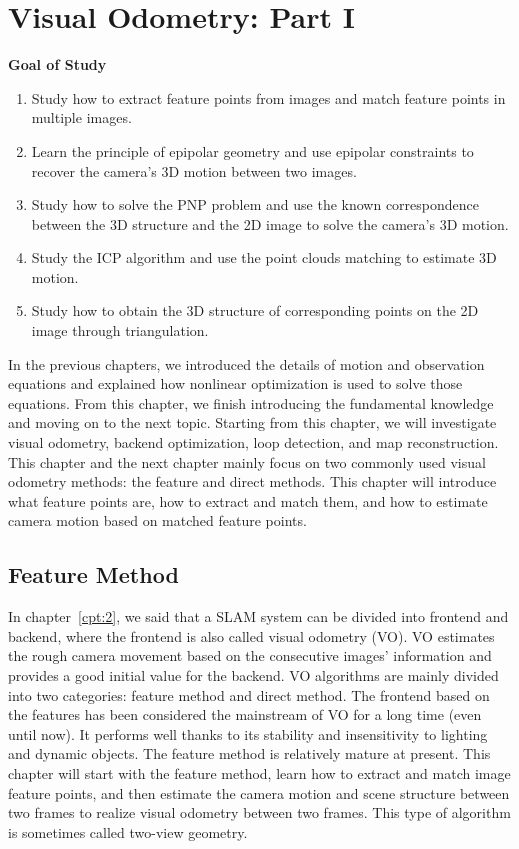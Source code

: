\chapter{Visual Odometry: Part I}
\label{cpt:7}
\thispagestyle{empty}

\begin{mdframed}  
	\textbf{Goal of Study}
	\begin{enumerate}[labelindent=0em,leftmargin=1.5em]
		\item Study how to extract feature points from images and match feature points in multiple images.
		\item Learn the principle of epipolar geometry and use epipolar constraints to recover the camera's 3D motion between two images.
		\item Study how to solve the PNP problem and use the known correspondence between the 3D structure and the 2D image to solve the camera's 3D motion.	
		\item Study the ICP algorithm and use the point clouds matching to estimate 3D motion.
		\item Study how to obtain the 3D structure of corresponding points on the 2D image through triangulation.
	\end{enumerate}
\end{mdframed}

In the previous chapters, we introduced the details of motion and observation equations and explained how nonlinear optimization is used to solve those equations. From this chapter, we finish introducing the fundamental knowledge and moving on to the next topic. Starting from this chapter, we will investigate visual odometry, backend optimization, loop detection, and map reconstruction. This chapter and the next chapter mainly focus on two commonly used visual odometry methods: the feature and direct methods. This chapter will introduce what feature points are, how to extract and match them, and how to estimate camera motion based on matched feature points.

\newpage


\newpage

\section{Feature Method}
In chapter~\ref{cpt:2}, we said that a SLAM system can be divided into frontend and backend, where the frontend is also called visual odometry (VO). VO estimates the rough camera movement based on the consecutive images' information and provides a good initial value for the backend. VO algorithms are mainly divided into two categories: feature method and direct method. The frontend based on the features has been considered the mainstream of VO for a long time (even until now). It performs well thanks to its stability and insensitivity to lighting and dynamic objects. The feature method is relatively mature at present. This chapter will start with the feature method, learn how to extract and match image feature points, and then estimate the camera motion and scene structure between two frames to realize visual odometry between two frames. This type of algorithm is sometimes called two-view geometry.

